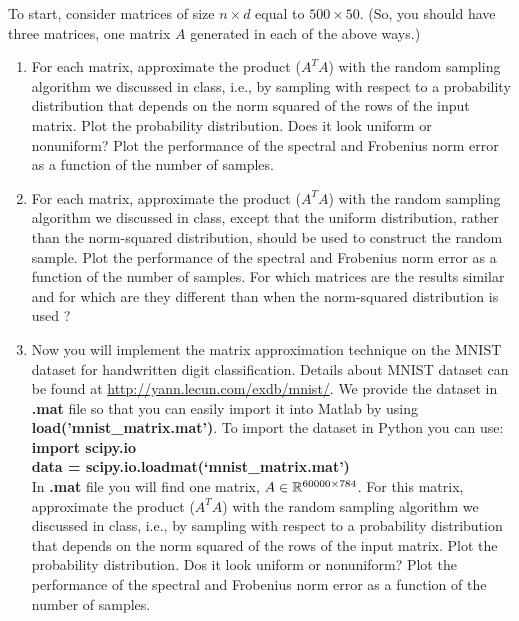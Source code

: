 \begin{enumerate}
To start, consider matrices of size $n \times d$ equal to $ 500 \times 50$. (So, you should have three matrices, one matrix $A$ generated in each of the above ways.)
\begin{enumerate}
    \item For each matrix, approximate the product ($A^T A$) with the random sampling algorithm we discussed in class, i.e., by sampling with respect to a probability distribution that depends on the norm squared of the rows of the input matrix. Plot the probability distribution. Does it look uniform or nonuniform? Plot the performance of the spectral and Frobenius norm error as a function of the number of samples.
    \item  For each matrix, approximate the product ($A^T A$) with the random sampling algorithm we discussed in class, except that the uniform distribution, rather than the norm-squared distribution, should be used to construct the random sample. Plot the performance of the spectral and Frobenius norm error as a function of the number of samples. For which matrices are the results similar and for which are they different than when the norm-squared distribution is used ?
    \item Now you will implement the matrix approximation technique on the MNIST dataset for handwritten digit classification. Details about MNIST dataset can be found at \url{http://yann.lecun.com/exdb/mnist/}. We provide the dataset in \textbf{.mat} file so that you can easily import it into Matlab by using \textbf{load('mnist\_matrix.mat')}. To import the dataset in Python you can use:\\
  \textbf{import scipy.io}\\
  \textbf{data = scipy.io.loadmat(`mnist\_matrix.mat')} \\
  In \textbf{.mat} file you will find one matrix, $A \in \mathbb{R}^{60000 \times 784}$. For this matrix, approximate the product ($A^T A$) with the random sampling algorithm we discussed in class, i.e., by sampling with respect to a probability distribution that depends on the norm squared of the rows of the input matrix. Plot the probability distribution. Dos it look uniform or nonuniform? Plot the performance of the spectral and Frobenius norm error as a function of the number of samples. 
\end{enumerate}
\solution{}

\end{enumerate}




